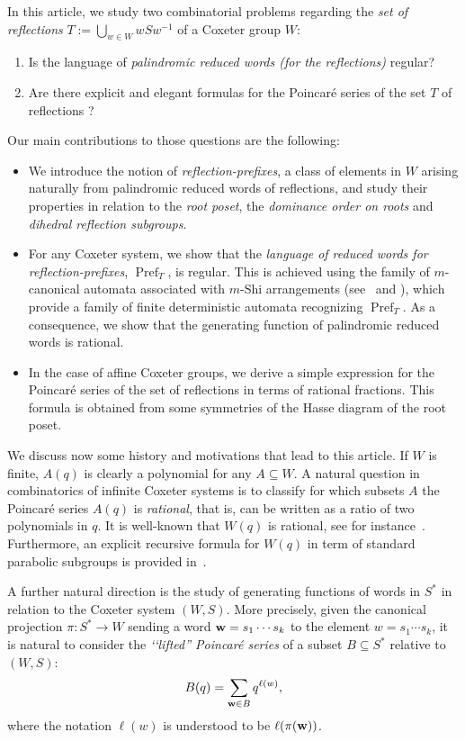 \documentclass{amsart}
\theoremstyle{definition}
\newcommand{\Pref}{\operatorname{Pref}}
\begin{document}
In this article, we study two combinatorial problems regarding the {\em set of reflections} $T:=\bigcup_{w\in W} wSw^{-1}$ of a Coxeter group $W$:
\begin{enumerate}
    \item Is the language of {\em palindromic reduced words (for the reflections)} regular?
    \item Are there explicit and elegant formulas for the Poincar\'e series of the set $T$ of reflections ?
\end{enumerate}
Our main contributions to those questions are the following: 
\begin{itemize}
\item We introduce the notion of  {\em reflection-prefixes}, a class of elements in $W$ arising naturally from  palindromic reduced words of reflections, and study their properties in relation to the {\em root poset}, the {\em dominance order on roots}  and {\em dihedral reflection subgroups}.
\item For any Coxeter system, we show that the {\em language of reduced words for reflection-prefixes}, $\Pref_T$, is regular. This is achieved using the family of $m$-canonical automata associated with $m$-Shi arrangements (see~\cite[\S3.4]{HNW} and \cite{DFHM24}), which provide a family of finite deterministic automata recognizing $\Pref_T$. As a consequence, we show that the generating function  of palindromic reduced words is rational.
\item In the case of affine Coxeter groups, we derive a simple expression for the Poincar\'e series of the set of reflections in terms of rational fractions. This formula is obtained from some symmetries of the Hasse diagram of the root poset.
\end{itemize}

We discuss now some history and motivations that lead to this article. 
If $W$ is finite, $A(q)$ is clearly a polynomial for any $A\subseteq W$. A natural question in combinatorics of infinite Coxeter systems is to classify for which subsets $A$ the Poincar\'e series $A(q)$ is {\em rational}, that is, can be written as a ratio of two polynomials in $q$. It is well-known that $W(q)$ is rational, see for instance~\cite[Corollary~7.1.8]{BB}. Furthermore, an explicit recursive formula for $W(q)$ in term of standard parabolic subgroups is provided in~\cite[Proposition~7.1.7]{BB}. 

A further natural direction is the study of generating functions of words in $S^*$ in relation to the Coxeter system $(W,S)$.  More precisely, given the canonical projection $\pi:S^* \rightarrow W$ sending a word $\bold w= s_1 \cdots  s_k$ to the element $w=s_1\cdots s_k$,
it is natural to  consider the {\em ‘‘lifted'' Poincar\'e series} of a subset $B\subseteq S^*$ relative to $(W,S)$:
$$
B(q)=\sum_{\bold w\in B} q^{\ell(w)},
$$
where the notation ${\ell(w)}$ is understood to be $\ell(\pi({\bf w}))$. 
\end{document}
